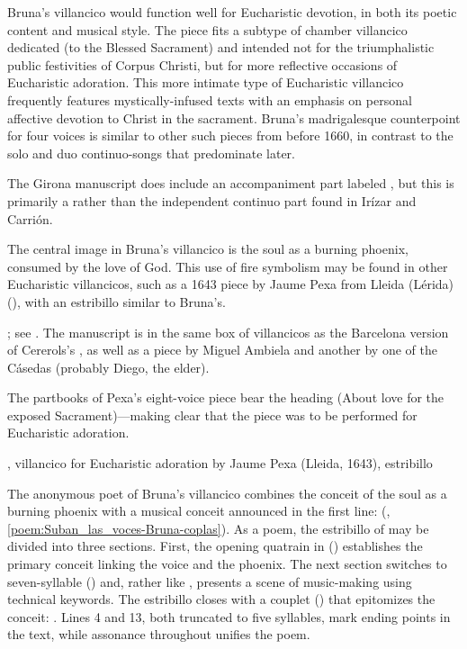 Bruna's villancico would function well for Eucharistic devotion, in both its
poetic content and musical style.  
The piece fits a subtype of chamber villancico dedicated  (to the Blessed Sacrament) and intended not for the triumphalistic 
public festivities of Corpus Christi, but for more reflective occasions of
Eucharistic adoration.
This more intimate type of Eucharistic villancico frequently features
mystically-infused texts with an emphasis on personal affective devotion to
Christ in the sacrament.  
Bruna's madrigalesque counterpoint for four voices is similar to other such
pieces from before 1660, in contrast to the solo and duo continuo-songs that
predominate later.%
\begin{Footnote}
    The Girona manuscript does include an accompaniment part labeled
    , but this is primarily a  rather
    than the independent continuo part found in Irízar and Carrión.
\end{Footnote}

The central image in Bruna's villancico is the soul as a burning phoenix,
consumed by the love of God.
This use of fire symbolism may be found in other Eucharistic villancicos, such
as a 1643 piece by Jaume Pexa from Lleida (Lérida)
(), with an estribillo similar to Bruna's.%
\begin{Footnote}
    ; see .
    The manuscript is in the same box of villancicos as the Barcelona version
    of Cererols's , as well as a piece by Miguel
    Ambiela and another by one of the Cásedas (probably Diego, the elder).  
\end{Footnote}
The partbooks of Pexa's eight-voice piece bear the heading  (About love for the exposed Sacrament)---making clear that
the piece was to be performed for Eucharistic adoration.  

{, villancico for Eucharistic adoration by Jaume Pexa
(Lleida, 1643), estribillo}

The anonymous poet of Bruna's villancico combines the conceit of the soul as a
burning phoenix with a musical conceit announced in the first line:  (,
\ref{poem:Suban_las_voces-Bruna-coplas}).
As a poem, the estribillo of  may be divided into three
sections. 
First, the opening quatrain in  () establishes
the primary conceit linking the voice and the phoenix.
The next section switches to seven-syllable 
() and, rather like , presents
a scene of music-making using technical keywords.
The estribillo closes with a couplet () that epitomizes the
conceit: .
Lines 4 and 13, both truncated to five syllables, mark ending points in the
text, while assonance throughout unifies the poem.

